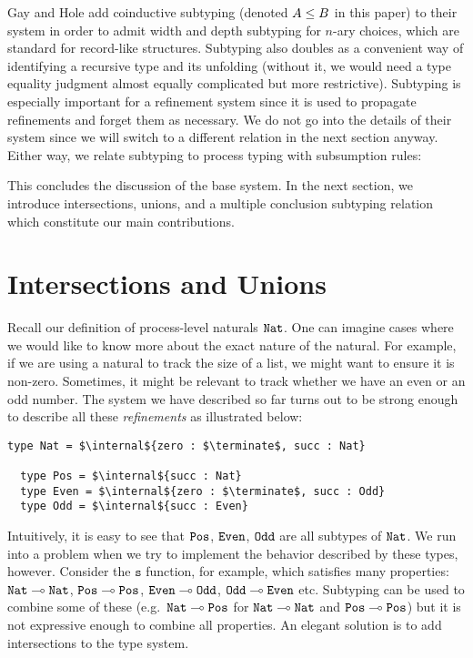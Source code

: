 \documentclass[submission,copyright,creativecommons]{eptcs}
\begin{document}
Gay and Hole \cite{GayH05} add coinductive subtyping (denoted $A \le B$ in this paper) to their system in order to admit width and depth subtyping for $n$-ary choices, which are standard for record-like structures. Subtyping also doubles as a convenient way of identifying a recursive type and its unfolding (without it, we would need a type equality judgment almost equally complicated but more restrictive). Subtyping is especially important for a refinement system since it is used to propagate refinements and forget them as necessary. We do not go into the details of their system since we will switch to a different relation in the next section anyway. Either way, we relate subtyping to process typing with subsumption rules:


This concludes the discussion of the base system. In the next section, we introduce intersections, unions, and a multiple conclusion subtyping relation which constitute our main contributions.


\section{Intersections and Unions}
\label{refinements}

Recall our definition of process-level naturals $\mathtt{Nat}$. One can imagine cases where we would like to know more about the exact nature of the natural. For example, if we are using a natural to track the size of a list, we might want to ensure it is non-zero. Sometimes, it might be relevant to track whether we have an even or an odd number. The system we have described so far turns out to be strong enough to describe all these \emph{refinements} as illustrated below:
\begin{lstlisting}[language=krill, style=custom]
  type Nat = $\internal${zero : $\terminate$, succ : Nat}

  type Pos = $\internal${succ : Nat}
  type Even = $\internal${zero : $\terminate$, succ : Odd}
  type Odd = $\internal${succ : Even}
\end{lstlisting}

Intuitively, it is easy to see that $\mathtt{Pos}$, $\mathtt{Even}$, $\mathtt{Odd}$ are all subtypes of $\mathtt{Nat}$. We run into a problem when we try to implement the behavior described by these types, however. Consider the $\mathtt{s}$ function, for example, which satisfies many properties: $\mathtt{Nat} \multimap \mathtt{Nat}$, $\mathtt{Pos} \multimap \mathtt{Pos}$, $\mathtt{Even} \multimap \mathtt{Odd}$, $\mathtt{Odd} \multimap \mathtt{Even}$ etc. Subtyping can be used to combine some of these (e.g.\ $\mathtt{Nat} \multimap \mathtt{Pos}$ for $\mathtt{Nat} \multimap \mathtt{Nat}$ and $\mathtt{Pos} \multimap \mathtt{Pos}$) but it is not expressive enough to combine all properties. An elegant solution is to add intersections to the type system.
\end{document}

